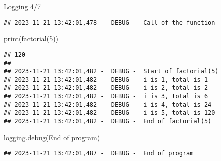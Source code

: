 \documentclass[
  8pt,
  ignorenonframetext,
]{beamer}
\newenvironment{Shaded}{\begin{snugshade}}{\end{snugshade}}
\newcommand{\BuiltInTok}[1]{#1}
\newcommand{\DecValTok}[1]{\textcolor[rgb]{0.00,0.00,0.81}{#1}}
\newcommand{\NormalTok}[1]{#1}
\newcommand{\StringTok}[1]{\textcolor[rgb]{0.31,0.60,0.02}{#1}}
\begin{document}
\begin{frame}[fragile]{Logging 4/7}
\begin{verbatim}
## 2023-11-21 13:42:01,478 -  DEBUG -  Call of the function
\end{verbatim}

\begin{Shaded}
\begin{Highlighting}[]
\BuiltInTok{print}\NormalTok{(factorial(}\DecValTok{5}\NormalTok{))}
\end{Highlighting}
\end{Shaded}

\begin{verbatim}
## 120
## 
## 2023-11-21 13:42:01,482 -  DEBUG -  Start of factorial(5)
## 2023-11-21 13:42:01,482 -  DEBUG -  i is 1, total is 1
## 2023-11-21 13:42:01,482 -  DEBUG -  i is 2, total is 2
## 2023-11-21 13:42:01,482 -  DEBUG -  i is 3, total is 6
## 2023-11-21 13:42:01,482 -  DEBUG -  i is 4, total is 24
## 2023-11-21 13:42:01,482 -  DEBUG -  i is 5, total is 120
## 2023-11-21 13:42:01,482 -  DEBUG -  End of factorial(5)
\end{verbatim}

\begin{Shaded}
\begin{Highlighting}[]
\NormalTok{logging.debug(}\StringTok{\textquotesingle{}End of program\textquotesingle{}}\NormalTok{)}
\end{Highlighting}
\end{Shaded}

\begin{verbatim}
## 2023-11-21 13:42:01,487 -  DEBUG -  End of program
\end{verbatim}
\end{frame}
\end{document}
